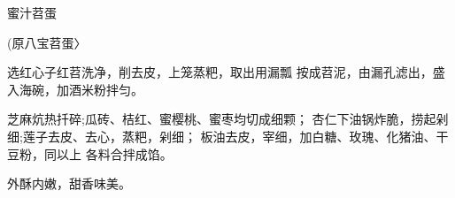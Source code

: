 \begin{recipe}{蜜汁苕蛋}

(原八宝苕蛋〉

\ingredients






\cooking

选红心子红苕洗净，削去皮，上笼蒸粑，取出用漏瓢 按成苕泥，由漏孔滤出，盛入海碗，加酒米粉拌匀。

\step 芝麻炕热扦碎;瓜砖、桔红、蜜樱桃、蜜枣均切成细颗； 杏仁下油锅炸脆，捞起剁细;莲子去皮、去心，蒸粑，剁细； 板油去皮，宰细，加白糖、玫瑰、化猪油、干豆粉，同以上 各料合拌成馅。

\notes

外酥内嫩，甜香味美。

\end{recipe}

